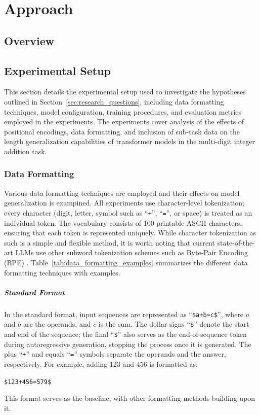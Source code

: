 \chapter{Approach}\label{approach}

\section{Overview}\label{sec:overview}

\section{Experimental Setup}\label{sec:experimental_setup}
This section details the experimental setup used to investigate the hypotheses outlined in Section~\ref{sec:research_questions}, including data formatting techniques, model configuration, training procedures, and evaluation metrics employed in the experiments. The experiments cover analysis of the effects of positional encodings, data formatting, and inclusion of sub-task data on the length generalization capabilities of transformer models in the multi-digit integer addition task.

\subsection{Data Formatting}\label{subsec:data_formatting}
Various data formatting techniques are employed and their effects on model generalization is exampined. All experiments use character-level tokenization; every character (digit, letter, symbol such as ``\texttt{+}'', ``\texttt{=}'', or space) is treated as an individual token. The vocabulary consists of 100 printable ASCII characters, ensuring that each token is represented uniquely. While character tokenization as such is a simple and flexible method, it is worth noting that current state-of-the-art LLMs use other subword tokenization schemes such as Byte-Pair Encoding (BPE) \parencite{sennrich_neural_2016,brown_language_2020}. Table~\ref{tab:data_formatting_examples} summarizes the different data formatting techniques with examples.

\paragraph{Standard Format}
In the standard format, input sequences are represented as ``\verb|$a+b=c$|'', where $a$ and $b$ are the operands, and $c$ is the sum. The dollar signs ``\verb|$|'' denote the start and end of the sequence; the final ``\verb|$|'' also serves as the end-of-sequence token during autoregressive generation, stopping the process once it is generated. The plus ``\verb|+|'' and equals ``\verb|=|'' symbols separate the operands and the answer, respectively. For example, adding 123 and 456 is formatted as:
\begin{center}
    \verb|$123+456=579$|
\end{center}
This format serves as the baseline, with other formatting methods building upon it.


